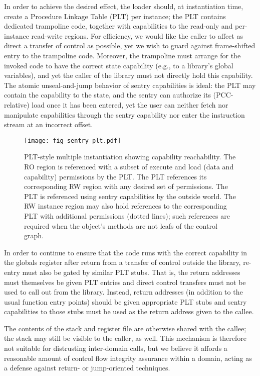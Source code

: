 In order to achieve the desired effect, the loader should, at instantiation
time, create a Procedure Linkage Table (PLT) per instance; the PLT contains
dedicated trampoline code, together with capabilities to the read-only and
per-instance read-write regions.  For efficiency, we would like the caller to
affect as direct a transfer of control as possible, yet we wish to guard
against frame-shifted entry to the trampoline code.  Moreover, the trampoline
must arrange for the invoked code to have the correct state capability (e.g.,
to a library's global variables), and yet the caller of the library must not
directly hold this capability.  The atomic unseal-and-jump behavior of sentry
capabilities is ideal: the PLT may contain the capability to the state, and the
sentry can authorize its (PCC-relative) load once it has been entered,
yet the user can neither fetch nor manipulate capabilities through the sentry
capability nor enter the instruction stream at an incorrect offset.

\begin{figure} %
\centering
\texttt{[image: fig-sentry-plt.pdf]}

\caption{PLT-style multiple instantiation showing capability reachability.
The RO region is referenced with a subset of execute and load (data and
capability) permissions by the PLT.  The PLT references its corresponding RW
region with any desired set of permissions.  The PLT is referenced using
sentry capabilities by the outside world.  The RW instance region may also
hold references to the corresponding PLT with additional permissions (dotted
lines); such references are required when the object's methods are not leafs
of the control graph.}
%
\label{fig:arch:sentry:plt}

\end{figure} %

In order to continue to ensure that the code runs with the correct
capability in the globals register after return from a transfer of control
outside the library, re-entry must also be gated by similar PLT stubs.  That
is, the return addresses must themselves be given PLT entries and direct
control transfers must not be used to call out from the library.  Instead,
return addresses (in addition to the usual function entry points) should be
given appropriate PLT stubs and sentry capabilities to those stubs must be
used as the return address given to the callee.

The contents of the stack and register file are otherwise shared with the
callee; the stack may still be visible to the caller, as well.  This
mechanism is therefore not suitable for distrusting inter-domain calls, but
we believe it affords a reasonable amount of control flow integrity
assurance within a domain, acting as a defense against return- or
jump-oriented techniques.

